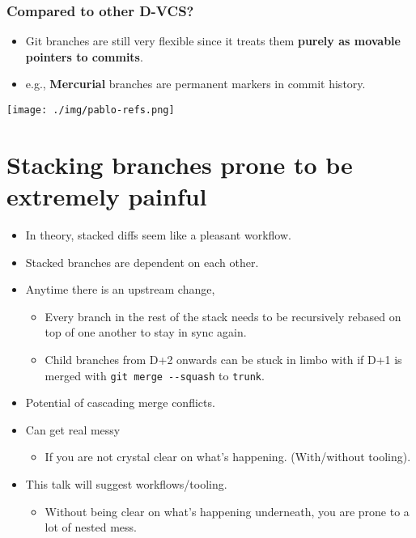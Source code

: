 \documentclass[11pt]{article}
\begin{document}
\subsubsection{Compared to other D-VCS?}
\label{sec:org534f7c4}
\begin{itemize}
\item Git branches are still very flexible since it treats them \textbf{purely as movable pointers to commits}.
\item e.g., \textbf{Mercurial} branches are permanent markers in commit history.
\end{itemize}

\begin{center}
\texttt{[image: ./img/pablo-refs.png]}
\end{center}
\section{Stacking branches prone to be extremely painful}
\label{sec:orgf7eb519}
\begin{itemize}
\item In theory, stacked diffs seem like a pleasant workflow.
\item Stacked branches are dependent on each other.
\item Anytime there is an upstream change,
\begin{itemize}
\item Every branch in the rest of the stack needs to be recursively rebased on top of one another to stay in sync again.
\item Child branches from D+2 onwards can be stuck in limbo with if D+1 is merged with \texttt{git merge -{}-{}squash} to \texttt{trunk}.
\end{itemize}
\item Potential of cascading merge conflicts.
\item Can get real messy
\begin{itemize}
\item If you are not crystal clear on what's happening. (With/without tooling).
\end{itemize}
\item This talk will suggest workflows/tooling.
\begin{itemize}
\item Without being clear on what's happening underneath, you are prone to a lot of nested mess.
\end{itemize}
\end{itemize}
\end{document}

